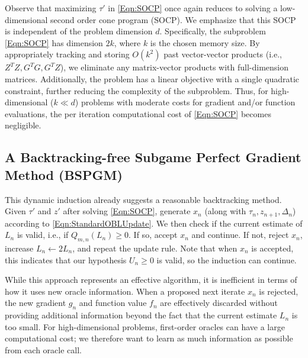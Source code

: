 \documentclass[11pt]{article}
\numberwithin{equation}{section}
\newcommand{\idxArgmin}{m}
\newcommand{\idxMem}{k}
\theoremstyle{definition}
\theoremstyle{plain}
\theoremstyle{definition}
\begin{document}
Observe that maximizing $\tau'$ in \eqref{Eqn:SOCP} once again reduces to solving a low-dimensional second order cone program (SOCP). We emphasize that this SOCP is independent of the problem dimension $d$. Specifically, the subproblem \eqref{Eqn:SOCP} has dimension $2\idxMem$, where $\idxMem$ is the chosen memory size. By appropriately tracking and storing $O(\idxMem^2)$ past vector-vector products (i.e., $Z^T Z, G^T G, G^T Z$), we eliminate any matrix-vector products with full-dimension matrices. Additionally, the problem has a linear objective with a single quadratic constraint, further reducing the complexity of the subproblem. Thus, for high-dimensional ($k \ll d$) problems with moderate costs for gradient and/or function evaluations, the per iteration computational cost of \eqref{Eqn:SOCP} becomes negligible. 

\subsection{A Backtracking-free Subgame Perfect Gradient Method (BSPGM)} \label{SubSec:LSFree}
This dynamic induction already suggests a reasonable backtracking method. Given $\tau'$ and $z'$ after solving \eqref{Eqn:SOCP}, generate $x_n$ (along with $\tau_n, z_{n+1}, \Delta_n$) according to \eqref{Eqn:StandardOBLUpdate}. We then check if the current estimate of $L_n$ is valid, i.e., if $Q_{\idxArgmin, n}(L_n) \geq 0$. If so, accept $x_n$ and continue. If not, reject $x_n$, increase $L_n \leftarrow 2L_n$, and repeat the update rule. Note that when $x_n$ is accepted, this indicates that our hypothesis $U_n \geq 0$ is valid, so the induction can continue.

While this approach represents an effective algorithm, it is inefficient in terms of how it uses new oracle information. When a proposed next iterate $x_n$ is rejected, the new gradient $g_n$ and function value $f_n$ are effectively discarded without providing additional information beyond the fact that the current estimate $L_n$ is too small. For high-dimensional problems, first-order oracles can have a large computational cost; we therefore want to learn as much information as possible from each oracle call.
\end{document}
